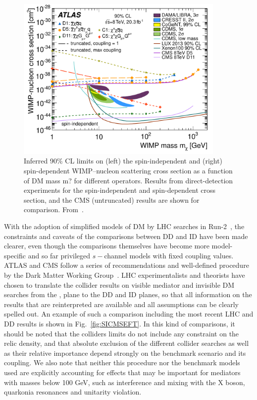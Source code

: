 \begin{figure}[!htpb]
\includegraphics[width=0.9\textwidth]{figures/Monojet8TeV_EFT_SI}
\caption{Inferred 90\% CL limits on (left) the spin-independent and (right) spin-dependent WIMP--nucleon scattering cross section as a function of DM mass m? for different operators. Results from direct-detection experiments for the spin-independent and spin-dependent cross section, and the CMS (untruncated) results are shown for comparison. From~\cite{monoXfig}.}
\label{fig:SIATLASEFT}
\end{figure}

With the adoption of simplified models of DM by LHC searches in Run-2~\cite{Abercrombie:2015wmb}, the
constraints and caveats of the comparisons between DD and ID have been made clearer, even though the comparisons themselves have become more model-specific and so far privileged $s-$channel models with fixed coupling values. ATLAS and CMS follow a series of recommendations and well-defined procedure by the Dark Matter Working Group~\cite{Boveia:2016mrp}. LHC experimentalists and theorists have chosen to translate the collider results on visible mediator and invisible DM searches from the \mdm, \mmed plane to the DD and ID planes, so that all information on the results that are reinterpreted are available and all assumptions can be clearly spelled out. An example of such a comparison including the most recent LHC and DD results is shown in Fig.~\ref{fig:SICMSEFT}. In this kind of comparisons, it should be noted that the colliders limits do not include any constraint on the relic density, and that absolute exclusion of the different collider searches as well as their relative importance depend strongly on the benchmark scenario and its coupling. We also note that neither this procedure nor the benchmark models used are explicitly accounting for effects that may be important for mediators with masses below 100 GeV, such as interference and mixing with the X boson, quarkonia resonances and unitarity violation. 

